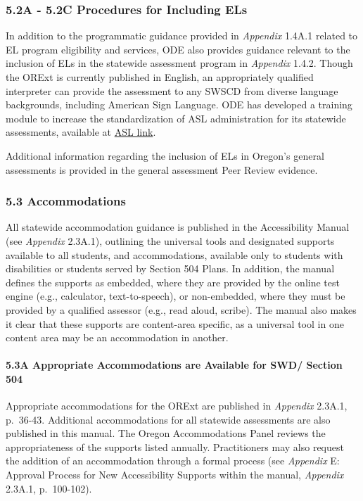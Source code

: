 \documentclass[]{article}
\let\oldparagraph\paragraph
\renewcommand{\paragraph}[1]{\oldparagraph{#1}\mbox{}}
\begin{document}
\subsubsection{5.2A - 5.2C Procedures for Including
ELs}\label{a---5.2c-procedures-for-including-els}

In addition to the programmatic guidance provided in \emph{Appendix}
1.4A.1 related to EL program eligibility and services, ODE also provides
guidance relevant to the inclusion of ELs in the statewide assessment
program in \emph{Appendix} 1.4.2. Though the ORExt is currently
published in English, an appropriately qualified interpreter can provide
the assessment to any SWSCD from diverse language backgrounds, including
American Sign Language. ODE has developed a training module to increase
the standardization of ASL administration for its statewide assessments,
available at \color{link} \href{http://lms.brtprojects.org}{ASL
link}.\color{black}

Additional information regarding the inclusion of ELs in Oregon's
general assessments is provided in the general assessment Peer Review
evidence.

\subsubsection{5.3 Accommodations}\label{accommodations}

All statewide accommodation guidance is published in the Accessibility
Manual (see \emph{Appendix} 2.3A.1), outlining the universal tools and
designated supports available to all students, and accommodations,
available only to students with disabilities or students served by
Section 504 Plans. In addition, the manual defines the supports as
embedded, where they are provided by the online test engine (e.g.,
calculator, text-to-speech), or non-embedded, where they must be
provided by a qualified assessor (e.g., read aloud, scribe). The manual
also makes it clear that these supports are content-area specific, as a
universal tool in one content area may be an accommodation in another.

\paragraph{5.3A Appropriate Accommodations are Available for SWD/
Section
504}\label{a-appropriate-accommodations-are-available-for-swd-section-504}

Appropriate accommodations for the ORExt are published in
\emph{Appendix} 2.3A.1, p.~36-43. Additional accommodations for all
statewide assessments are also published in this manual. The Oregon
Accommodations Panel reviews the appropriateness of the supports listed
annually. Practitioners may also request the addition of an
accommodation through a formal process (see \emph{Appendix} E: Approval
Process for New Accessibility Supports within the manual,
\emph{Appendix} 2.3A.1, p.~100-102).
\end{document}
